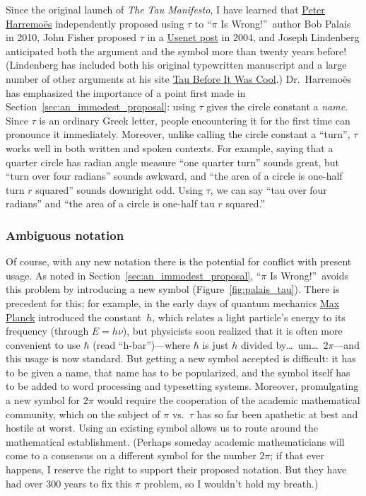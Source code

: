 Since the original launch of \emph{The Tau Manifesto}, I have learned that \href{http://www.harremoes.dk/Peter/}{Peter Harremo\"{e}s} independently proposed using $\tau$ to ``$\pi$ Is Wrong!''\ author Bob Palais in 2010, John Fisher proposed $\tau$ in a \href{https://groups.google.com/forum/#!msg/sci.math/c-DHmJHSA0A/sLCoOtHB1UAJ}{Usenet post} in 2004, and Joseph Lindenberg anticipated both the argument and the symbol more than twenty years before! (Lindenberg has included both his original typewritten manuscript and a large number of other arguments at his site \href{http://sites.google.com/site/taubeforeitwascool/}{Tau Before It Was Cool}.) Dr.~Harremo\"{e}s has emphasized the importance of a point first made in Section~\ref{sec:an_immodest_proposal}: using $\tau$ gives the circle constant a \emph{name}. Since $\tau$ is an ordinary Greek letter, people encountering it for the first time can pronounce it immediately. Moreover, unlike calling the circle constant a ``turn'',
$\tau$ works well in both written and spoken contexts. For example, saying that a quarter circle has radian angle measure ``one quarter turn'' sounds great, but ``turn over four radians'' sounds awkward, and ``the area of a circle is one-half turn $r$ squared'' sounds downright odd. Using $\tau$, we can say ``tau over four radians'' and ``the area of a circle is one-half tau $r$ squared.''

    \subsubsection{Ambiguous notation} %
    \label{sec:ambiguous_notation}


Of course, with any new notation there is the potential for conflict with present usage. As noted in Section~\ref{sec:an_immodest_proposal}, ``$\pi$ Is Wrong!''\ avoids this problem by introducing a new symbol (Figure~\ref{fig:palais_tau}). There is precedent for this; for example, in the early days of quantum mechanics \href{http://en.wikipedia.org/wiki/Max_Planck}{Max Planck} introduced the constant~$h$, which relates a light particle's energy to its frequency (through $E = h\nu$), but physicists soon realized that it is often more convenient to use $\hbar$ (read ``h-bar'')---where $\hbar$ is just $h$ divided by\ldots\ um\ldots\ $2\pi$---and this usage is now standard. But getting a new symbol accepted is difficult: it has to be given a name, that name has to be popularized, and the symbol itself has to be added to word processing and typesetting systems. Moreover, promulgating a new symbol for $2\pi$ would require the cooperation of the academic mathematical community, which on the subject of $\pi$ vs.\ $\tau$ has so far been apathetic at best and hostile at worst. Using an existing symbol allows us to route around the mathematical establishment. (Perhaps someday academic mathematicians will come to a consensus on a different symbol for the number $2\pi$; if that ever happens, I reserve the right to support their proposed notation. But they have had over 300 years to fix this $\pi$ problem, so I wouldn't hold my breath.)

